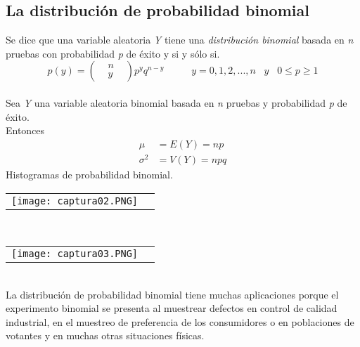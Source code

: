 \documentclass[10pt]{article}\usepackage[]{graphicx}\usepackage[]{color}
\begin{document}
\subsection{La distribución de probabilidad binomial}
Se dice que una variable aleatoria \textit{Y} tiene una \textit{distribución binomial} basada en \textit{n} pruebas con probabilidad \textit{p} de éxito y si y sólo si.
\begin{equation*}
p(y)=\begin{pmatrix}
&n&\\
&y&
\end{pmatrix}
p^yq^{n-y}\; \; \; \; \; \; \; \; \; \;     y=0,1,2,...,n \;\; \;y \; \; \;0\leq p \geq 1
\end{equation*}\\
Sea \textit{Y} una variable aleatoria binomial basada en \textit{n} pruebas y probabilidad  \textit{p} de éxito.\\
Entonces
\begin{align*}
\mu&=E(Y)=np\\
\sigma^2&=V(Y)=npq
\end{align*}
Histogramas de probabilidad binomial.\\
\begin{tabular}{p{} p{} }
\texttt{[image: captura02.PNG]}
\end{tabular}\\
\begin{tabular}{p{} p{} }
\texttt{[image: captura03.PNG]}
\end{tabular}\\
La distribución de probabilidad binomial tiene muchas aplicaciones porque el experimento 
binomial se presenta al muestrear defectos en control de calidad industrial, en el muestreo de 
preferencia de los consumidores o en poblaciones de votantes y en muchas otras situaciones 
físicas.
\end{document}

